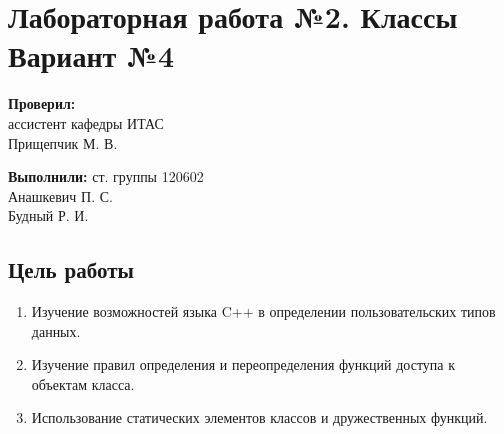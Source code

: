 \documentclass[a4paper,12pt]{article}
\begin{document}
\section*{Лабораторная работа №2.  Классы \\  Вариант №4}


\begin{multicols}{2}
  \begin{flushleft}
    \textbf{Проверил:} \\
    ассистент кафедры ИТАС \\
    Прищепчик М. В.

  \end{flushleft}

  \begin{flushright}
    \textbf{Выполнили:} ст. группы 120602 \\
    Анашкевич П. С. \\
    Будный Р. И. 
  \end{flushright}
\end{multicols}

\subsection{Цель работы}
\begin{enumerate}

\item Изучение возможностей языка C++ в определении пользовательских типов данных.
\item Изучение правил определения и переопределения функций доступа к объектам класса.
\item Использование статических элементов классов и дружественных функций.

\end{enumerate}
\end{document}
